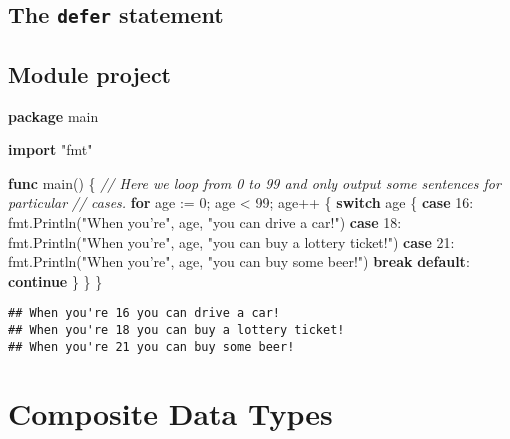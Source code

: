 \documentclass[]{book}
\newenvironment{Shaded}{\begin{snugshade}}{\end{snugshade}}
\newcommand{\CommentTok}[1]{\textcolor[rgb]{0.56,0.35,0.01}{\textit{#1}}}
\newcommand{\DecValTok}[1]{\textcolor[rgb]{0.00,0.00,0.81}{#1}}
\newcommand{\KeywordTok}[1]{\textcolor[rgb]{0.13,0.29,0.53}{\textbf{#1}}}
\newcommand{\NormalTok}[1]{#1}
\newcommand{\StringTok}[1]{\textcolor[rgb]{0.31,0.60,0.02}{#1}}
\begin{document}
\hypertarget{the-defer-statement}{%
\section{\texorpdfstring{The \texttt{defer} statement}{The defer statement}}\label{the-defer-statement}}

\hypertarget{module-project-1}{%
\section*{Module project}\label{module-project-1}}

\begin{Shaded}
\begin{Highlighting}[]
\KeywordTok{package}\NormalTok{ main}

\KeywordTok{import} \StringTok{"fmt"}

\KeywordTok{func}\NormalTok{ main() \{}
    \CommentTok{// Here we loop from 0 to 99 and only output some sentences for particular}
    \CommentTok{// cases.}
    \KeywordTok{for}\NormalTok{ age := }\DecValTok{0}\NormalTok{; age < }\DecValTok{99}\NormalTok{; age++ \{}
        \KeywordTok{switch}\NormalTok{ age \{}
        \KeywordTok{case} \DecValTok{16}\NormalTok{:}
\NormalTok{            fmt.Println(}\StringTok{"When you're"}\NormalTok{, age, }\StringTok{"you can drive a car!"}\NormalTok{)}
        \KeywordTok{case} \DecValTok{18}\NormalTok{:}
\NormalTok{            fmt.Println(}\StringTok{"When you're"}\NormalTok{, age, }\StringTok{"you can buy a lottery ticket!"}\NormalTok{)}
        \KeywordTok{case} \DecValTok{21}\NormalTok{:}
\NormalTok{            fmt.Println(}\StringTok{"When you're"}\NormalTok{, age, }\StringTok{"you can buy some beer!"}\NormalTok{)}
            \KeywordTok{break}
        \KeywordTok{default}\NormalTok{:}
            \KeywordTok{continue}
\NormalTok{        \}}
\NormalTok{    \}}
\NormalTok{\}}
\end{Highlighting}
\end{Shaded}

\begin{verbatim}
## When you're 16 you can drive a car!
## When you're 18 you can buy a lottery ticket!
## When you're 21 you can buy some beer!
\end{verbatim}

\hypertarget{composite-data-types}{%
\chapter{Composite Data Types}\label{composite-data-types}}
\end{document}
